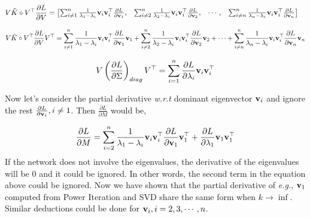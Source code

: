 	\begin{equation}
	\begin{aligned}
	V \tilde{K}\circ V^{\top}\frac{\partial L}{\partial V} &=
	\begin{bmatrix}
	\sum_{i\neq 1}^{n}\frac{1}{\lambda_{1}-\lambda_{i}}\mathbf{v}_{i}\mathbf{v}_{i}^{\top}\frac{\partial L}{\partial \mathbf{v}_{1}},
	& \sum_{i\neq 2}^{n}\frac{1}{\lambda_{2}-\lambda_{i}}\mathbf{v}_{i}\mathbf{v}_{i}^{\top}\frac{\partial L}{\partial \mathbf{v}_{2}}, 
	&\cdots,
	&\sum_{i\neq n}^{n}\frac{1}{\lambda_{n}-\lambda_{i}}\mathbf{v}_{i}\mathbf{v}_{i}^{\top}\frac{\partial L}{\partial \mathbf{v}_{n}}
	\end{bmatrix}
	\end{aligned}
	\end{equation}	
	
	\begin{equation}
	V \tilde{K}\circ V^{\top}\frac{\partial L}{\partial V} V^{\top} =
	\sum_{i\neq 1}^{n}\frac{1}{\lambda_{1}-\lambda_{i}}\mathbf{v}_{i}\mathbf{v}_{i}^{\top}\frac{\partial L}{\partial \mathbf{v}_{1}} \mathbf{v}_{1}
	+ \sum_{i\neq 2}^{n}\frac{1}{\lambda_{2}-\lambda_{i}}\mathbf{v}_{i}\mathbf{v}_{i}^{\top}\frac{\partial L}{\partial \mathbf{v}_{2}} \mathbf{v}_{2}
	+\cdots
	+\sum_{i\neq n}^{n}\frac{1}{\lambda_{n}-\lambda_{i}}\mathbf{v}_{i}\mathbf{v}_{i}^{\top}\frac{\partial L}{\partial \mathbf{v}_{n}} \mathbf{v}_{n}
	\end{equation}	
	
	\begin{equation}
    V\left(\frac{\partial L}{\partial \Sigma}\right)_{d i a g} V^{\top} = \sum_{i=1}^n \frac{\partial L}{\partial \lambda_i}\mathbf{v}_{i}\mathbf{v}_{i}^{\top}
	\end{equation}    	
	
	Now let's consider the partial derivative \emph{w.r.t} dominant eigenvector $\mathbf{v}_{i}$ and ignore the rest $\frac{\partial L}{\partial \mathbf{v}_{i}}, i \neq 1$.
	Then $\frac{\partial L}{\partial M}$ would be,
	
	\begin{equation}
	\frac{\partial L}{\partial M}=\sum_{i=2}^{n}\frac{1}{\lambda_{1}-\lambda_{i}}\mathbf{v}_{i}\mathbf{v}_{i}^{\top}\frac{\partial L}{\partial \mathbf{v}_{1}}\mathbf{v}_{1}^{\top} + \frac{\partial L}{\partial \lambda_1}\mathbf{v}_{1}\mathbf{v}_{1}^{\top}
	\end{equation}
If the network does not involve the eigenvalues, the derivative of the eigenvalues will be 0 and it could be ignored. In other words, the second term in the equation above could be ignored.
Now we have shown that the partial derivative of \emph{e.g.}, $\mathbf{v}_1$ computed from Power Iteration and SVD share the same form when $k\rightarrow \inf$.
Similar deductions could be done for  $\mathbf{v}_i, i=2,3,\cdots, n$.


